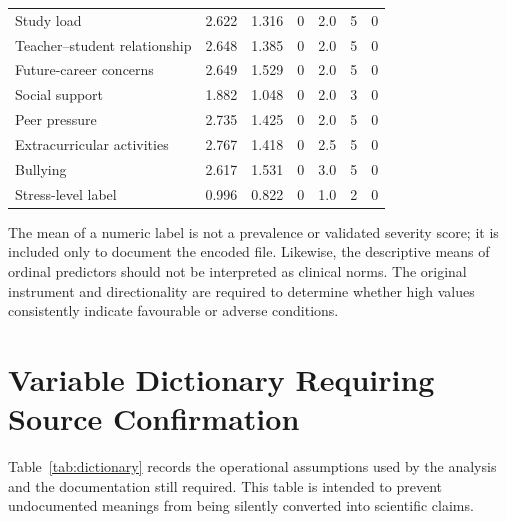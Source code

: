 \documentclass[review]{elsarticle}
\begin{document}
{\begin{longtable}{p{3.4cm}rrrrrr}
Study load & 2.622 & 1.316 & 0 & 2.0 & 5 & 0 \\
Teacher--student relationship & 2.648 & 1.385 & 0 & 2.0 & 5 & 0 \\
Future-career concerns & 2.649 & 1.529 & 0 & 2.0 & 5 & 0 \\
Social support & 1.882 & 1.048 & 0 & 2.0 & 3 & 0 \\
Peer pressure & 2.735 & 1.425 & 0 & 2.0 & 5 & 0 \\
Extracurricular activities & 2.767 & 1.418 & 0 & 2.5 & 5 & 0 \\
Bullying & 2.617 & 1.531 & 0 & 3.0 & 5 & 0 \\
Stress-level label & 0.996 & 0.822 & 0 & 1.0 & 2 & 0 \\
\end{longtable}
}

The mean of a numeric label is not a prevalence or validated severity score; it is included only to document the encoded file. Likewise, the descriptive means of ordinal predictors should not be interpreted as clinical norms. The original instrument and directionality are required to determine whether high values consistently indicate favourable or adverse conditions.

\clearpage
\section{Variable Dictionary Requiring Source Confirmation}\label{app:dictionary}
Table~\ref{tab:dictionary} records the operational assumptions used by the analysis and the documentation still required. This table is intended to prevent undocumented meanings from being silently converted into scientific claims.
\end{document}
